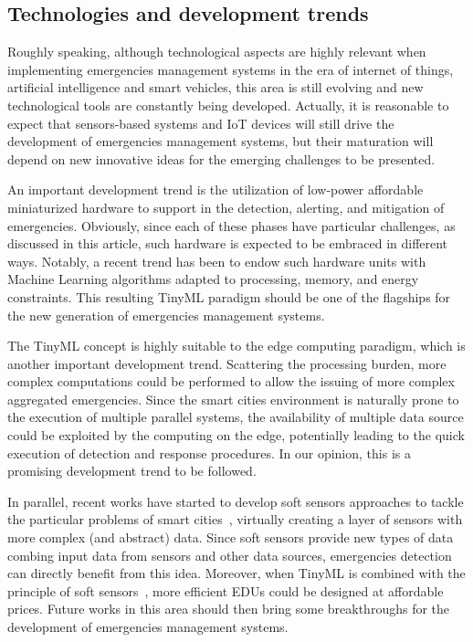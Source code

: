 \begin{refsection}
\subsection{Technologies and development trends}

Roughly speaking, although technological aspects are highly relevant when implementing emergencies management systems in the era of internet of things, artificial intelligence and smart vehicles, this area is still evolving and new technological tools are constantly being developed. Actually, it is reasonable to expect that sensors-based systems and IoT devices will still drive the development of emergencies management systems, but their maturation will depend on new innovative ideas for the emerging challenges to be presented.

An important development trend is the utilization of low-power affordable miniaturized hardware to support in the detection, alerting, and mitigation of emergencies. Obviously, since each of these phases have particular challenges, as discussed in this article, such hardware is expected to be embraced in different ways. Notably, a recent trend has been to endow such hardware units with Machine Learning algorithms adapted to processing, memory, and energy constraints. This resulting TinyML paradigm should be one of the flagships for the new generation of emergencies management systems. 

The TinyML concept is highly suitable to the edge computing paradigm, which is another important development trend. Scattering the processing burden, more complex computations could be performed to allow the issuing of more complex aggregated emergencies. Since the smart cities environment is naturally prone to the execution of multiple parallel systems, the availability of multiple data source could be exploited by the computing on the edge, potentially leading to the quick execution of detection and response procedures. In our opinion, this is a promising development trend to be followed.

In parallel, recent works have started to develop soft sensors approaches to tackle the particular problems of smart cities~\cite{softsensor,softsensor3}, virtually creating a layer of sensors with more complex (and abstract) data. Since soft sensors provide new types of data combing input data from sensors and other data sources, emergencies detection can directly benefit from this idea. Moreover, when TinyML is combined with the principle of soft sensors~\cite{softsensor2}, more efficient EDUs could be designed at affordable prices. Future works in this area should then bring some breakthroughs for the development of emergencies management systems.


\end{refsection}
